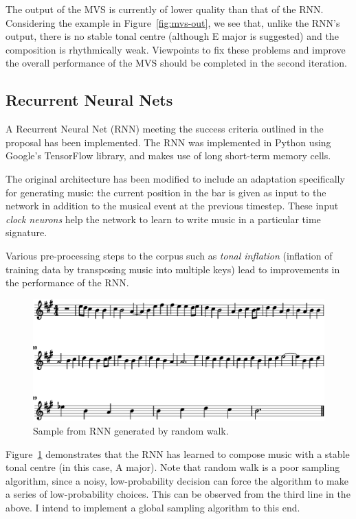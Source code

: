 \documentclass[12pt,a4paper,twoside]{article}
\begin{document}
The output of the MVS is currently of lower quality than that of the RNN.
Considering the example in Figure~\ref{fig:mvs-out}, we see that, unlike the
RNN's output, there is no stable tonal centre (although E major is suggested)
and the composition is rhythmically weak. Viewpoints to fix these problems and
improve the overall performance of the MVS should be completed in the second
iteration.

\subsection*{Recurrent Neural Nets}

A Recurrent Neural Net (RNN) meeting the success criteria outlined in the
proposal has been implemented. The RNN was implemented in Python using Google's 
TensorFlow library, and makes use of long short-term memory cells. 

The original architecture has been modified to include an adaptation specifically
for generating music: the current position in the bar is given as input to the
network in addition to the musical event at the previous timestep. These input
\emph{clock neurons} help the network to learn to write music in a particular
time signature.

Various pre-processing steps to the corpus such as \emph{tonal inflation}
(inflation of training data by transposing music into multiple keys) lead to
improvements in the performance of the RNN.

\begin{figure}[H]
\centering
\includegraphics[width=400pt]{figs/rnn_trimmed.eps}
\caption{Sample from RNN generated by random walk.}
\label{fig:rnn-out}
\end{figure}
Figure~\ref{fig:rnn-out} demonstrates that the RNN has learned to compose music
with a stable tonal centre (in this case, A major). Note that random walk is a
poor sampling algorithm, since a noisy, low-probability decision can force the
algorithm to make a series of low-probability choices. This can be observed from
the third line in the above. I intend to implement a global sampling algorithm
to this end.
\end{document}
